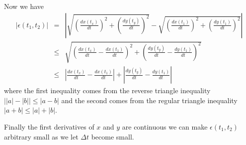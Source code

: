 \documentclass[13pt]{article}
\begin{document}
Now we have 
\begin{eqnarray*}
	\left| \epsilon(t_1, t_2) \right| &=& \left|\sqrt{ \left(  \frac{dx(t_x)}{dt} \right)^2 + \left( \frac{dy(t_y)}{dt} \right)^2 } - \sqrt{ \left(  \frac{dx(t_1)}{dt} \right)^2 + \left( \frac{dy(t_1)}{dt} \right)^2 } \right| \\
		                  &\le& \sqrt{\left(\frac{dx(t_x)}{dt} - \frac{dx(t_1)}{dt} \right) ^ 2 + \left(\frac{dy(t_y)}{dt} - \frac{dy(t_1)}{dt} \right) ^ 2}  \\
		                  &\le& \left| \frac{dx(t_x)}{dt} - \frac{dx(t_1)}{dt} \right| + \left| \frac{dy(t_y)}{dt} - \frac{dy(t_1)}{dt} \right|
\end{eqnarray*}
where the first inequality comes from the reverse triangle inequality  $\left| \left|a\right| - \left|b\right| \right| \le \left| a-b \right|$ and the second comes from the regular triangle inequality $\left| a+b \right| \le \left|a\right| + \left|b\right|$. 

Finally the first derivatives of $x$ and $y$ are continuous we can make $\epsilon(t_1, t_2)$ arbitrary small as we let $\Delta t$ become small.
\end{document}
